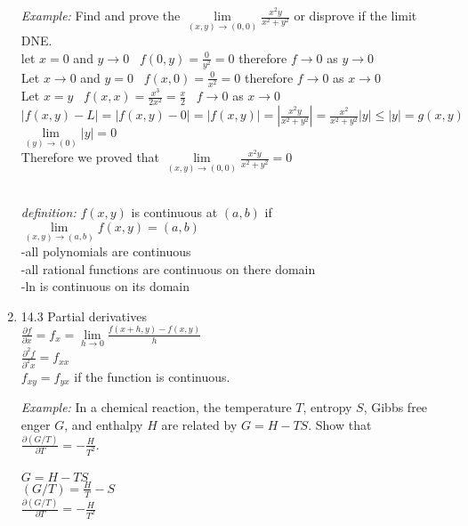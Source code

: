 \documentclass[11pt]{article}
\begin{document}
\begin{enumerate}
\begin{center}
\textit{Example:}
Find and prove the $\lim \limits_{(x,y) \to (0,0)} \frac{x^2y}{x^2+y^2}$ or disprove if the limit DNE.
\\
let $x=0$ and $y \to 0 \; \; \; f(0,y)=\frac{0}{y^2}=0 $ therefore $f \to 0$ as $y \to 0$
\\
Let $x \to 0$ and $y=0 \; \; \; f(x,0)=\frac{0}{x^2}=0$ therefore $f \to 0$ as $x \to 0$
\\
Let $x=y \; \; \; f(x,x)= \frac{x^3}{2x^2}=\frac{x}{2} \; \; \; f \to 0$ as $x \to 0$
\\
$|f(x,y)-L|=|f(x,y)-0|=|f(x,y)|=|\frac{x^2y}{x^2+y^2}|=\frac{x^2}{x^2+y^2}|y| \le |y|= g(x,y)$
\\
$\lim \limits_{(y) \to (0)} |y|=0$
\\
Therefore we proved that $\lim \limits_{(x,y) \to (0,0)} \frac{x^2y}{x^2+y^2}=0$


\end{center}
\\
\textit{definition:} $f(x,y)$ is continuous at $(a,b)$ if $\lim \limits_{(x,y) \to (a,b)} f(x,y)=(a,b)$
\\
-all polynomials are continuous
\\
-all rational functions are continuous on there domain
\\
-ln is continuous on its domain










\item 14.3 Partial derivatives
\\
$\frac{\partial f}{\partial x}=f_x= \lim \limits_{h \to 0} \frac{f(x+h,y)-f(x,y)}{h}$
\\
$\frac{\partial^2 f}{\partial^2 x}=f_{xx}$
\\
$f_{xy}=f_{yx}$ if the function is continuous. 
\\
\begin{center}
\textit{Example:}
In a chemical reaction, the temperature $T$, entropy $S$, Gibbs free enger $G$, and enthalpy $H$ are related by $G = H - TS$.  Show that $\frac{\partial(G/T)}{\partial T} =  - \frac{H}{T^2}$.
    \\
   
    \\
    $G=H-TS$
    \\
    $(G/T)=\frac{H}{T}-S$
    \\
    $\frac{\partial(G/T)}{\partial T}=-\frac{H}{T^2}$



\end{center}
\end{enumerate}
\end{document}
